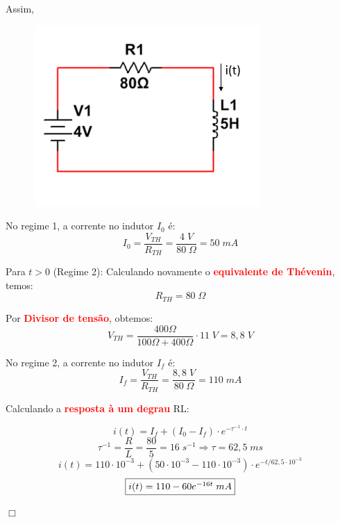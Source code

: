 \documentclass[
	12pt,				%
	oneside,			%
	a4paper,			%
	english,			%
	french,				%
	spanish,			%
	brazil				%
	]{abntex2}
\begin{document}
Assim,
\begin{figure}[htb]
	\centering
	\includegraphics[scale=0.60]{Circuito_2-15(a).PNG}
\end{figure}

No regime 1, a corrente no indutor $I_0$ é:
$$I_0 = \dfrac{V_{TH}}{R_{TH}} = \dfrac{4\;V}{80\;\Omega} = 50\;mA$$
\newpage

Para $t>0$ (Regime 2):
Calculando novamente o \textbf{\textcolor{red}{equivalente de Thévenin}}, temos:
$$R_{TH} = 80\;\Omega$$

Por \textbf{\textcolor{red}{Divisor de tensão}}, obtemos:
$$V_{TH} = \dfrac{400\Omega}{100\Omega+400\Omega} \cdot 11\;V = 8,8\;V$$

No regime 2, a corrente no indutor $I_f$ é:
$$I_f = \dfrac{V_{TH}}{R_{TH}} = \dfrac{8,8\;V}{80\;\Omega} = 110\;mA$$

Calculando a \textbf{\textcolor{red}{resposta à um degrau}} RL:

$$i(t) = I_f+(I_0-I_f) \cdot e^{- \tau^{-1} \cdot t}$$
$$\tau^{-1} = \dfrac{R}{L} = \dfrac{80}{5} = 16\;s^{-1} \Longrightarrow \tau = 62,5\;ms$$
$$i(t) = 110 \cdot 10^{-3}+(50 \cdot 10^{-3}-110 \cdot 10^{-3}) \cdot e^{- t/62,5\cdot 10^{-3}}$$
\begin{equation}
    \centering
    \fbox{$i(t) = 110 - 60e^{-16t}\;mA$}
\end{equation}

\begin{flushright}
    $\Box$
\end{flushright}
\newpage

\end{document}
